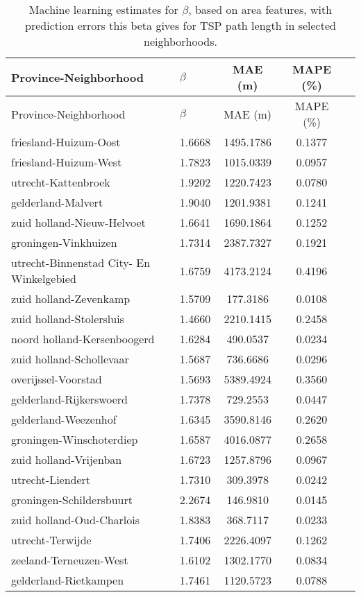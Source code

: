 \begin{longtable}{llccc}
\caption{Machine learning estimates for $\beta$, based on area features, with prediction errors this beta gives for TSP path length in selected neighborhoods.} \label{tab:ml_results}\\
\hline
Province-Neighborhood & $\beta$ & MAE (m) & MAPE (\%) \\
\hline
\endfirsthead
\hline
Province-Neighborhood & $\beta$ & MAE (m) & MAPE (\%) \\
\hline
\endhead
friesland-Huizum-Oost & 1.6668 & 1495.1786 & 0.1377 \\
friesland-Huizum-West & 1.7823 & 1015.0339 & 0.0957 \\
utrecht-Kattenbroek & 1.9202 & 1220.7423 & 0.0780 \\
gelderland-Malvert & 1.9040 & 1201.9381 & 0.1241 \\
zuid holland-Nieuw-Helvoet & 1.6641 & 1690.1864 & 0.1252 \\
groningen-Vinkhuizen & 1.7314 & 2387.7327 & 0.1921 \\
utrecht-Binnenstad City- En Winkelgebied & 1.6759 & 4173.2124 & 0.4196 \\
zuid holland-Zevenkamp & 1.5709 & 177.3186 & 0.0108 \\
zuid holland-Stolersluis & 1.4660 & 2210.1415 & 0.2458 \\
noord holland-Kersenboogerd & 1.6284 & 490.0537 & 0.0234 \\
zuid holland-Schollevaar & 1.5687 & 736.6686 & 0.0296 \\
overijssel-Voorstad & 1.5693 & 5389.4924 & 0.3560 \\
gelderland-Rijkerswoerd & 1.7378 & 729.2553 & 0.0447 \\
gelderland-Weezenhof & 1.6345 & 3590.8146 & 0.2620 \\
groningen-Winschoterdiep & 1.6587 & 4016.0877 & 0.2658 \\
zuid holland-Vrijenban & 1.6723 & 1257.8796 & 0.0967 \\
utrecht-Liendert & 1.7310 & 309.3978 & 0.0242 \\
groningen-Schildersbuurt & 2.2674 & 146.9810 & 0.0145 \\
zuid holland-Oud-Charlois & 1.8383 & 368.7117 & 0.0233 \\
utrecht-Terwijde & 1.7406 & 2226.4097 & 0.1262 \\
zeeland-Terneuzen-West & 1.6102 & 1302.1770 & 0.0834 \\
gelderland-Rietkampen & 1.7461 & 1120.5723 & 0.0788 \\

\end{longtable}
